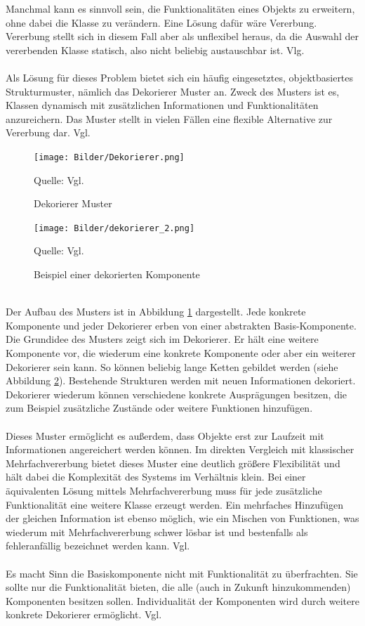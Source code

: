 \documentclass[fontsize=11pt,a4paper,final]{scrreprt}[2003/01/01]
\newcommand*{\quelle}{%
	\footnotesize Quelle: 
}
\begin{document}
Manchmal kann es sinnvoll sein, die Funktionalitäten eines Objekts zu erweitern, ohne dabei die Klasse zu verändern. Eine Lösung dafür wäre Vererbung. Vererbung stellt sich in diesem Fall aber als unflexibel heraus, da die Auswahl der vererbenden Klasse statisch, also nicht beliebig austauschbar ist. Vlg. \cite[S. 199]{gamma2004}
\\ \\
Als Lösung für dieses Problem bietet sich ein häufig eingesetztes, objektbasiertes Strukturmuster, nämlich das Dekorierer Muster an. Zweck des Musters ist es, Klassen dynamisch mit zusätzlichen Informationen und Funktionalitäten anzureichern. Das Muster stellt in vielen Fällen eine flexible Alternative zur Vererbung dar. Vgl. \cite[S. 199 ]{gamma2004}

\begin{figure}[H]
	\centering
	\texttt{[image: Bilder/Dekorierer.png]}
	\caption{Dekorierer Muster}
	\quelle{ Vgl. \cite[S. 201]{gamma2004}}
	\label{fig:Dekorierer}
\end{figure}

\begin{figure}[H]
	\centering
	\texttt{[image: Bilder/dekorierer\_2.png]}
	\caption{Beispiel einer dekorierten Komponente}
	\quelle{Vgl. \cite[S. 205]{gamma2004}} 
	\label{fig:Beispiel einer dekorierten Komponente}
\end{figure}
\ \\
Der Aufbau des Musters ist in Abbildung \ref{fig:Dekorierer} dargestellt. Jede konkrete Komponente und jeder Dekorierer erben von einer abstrakten Basis-Komponente. Die Grundidee des Musters zeigt sich im Dekorierer. Er hält eine weitere Komponente vor, die wiederum eine konkrete Komponente oder aber ein weiterer Dekorierer sein kann. So können beliebig lange Ketten gebildet werden (siehe Abbildung \ref{fig:Beispiel einer dekorierten Komponente}). Bestehende Strukturen werden mit neuen Informationen \glqq dekoriert\grqq. Dekorierer wiederum können verschiedene konkrete Ausprägungen besitzen, die zum Beispiel zusätzliche Zustände oder weitere Funktionen hinzufügen.
\\ \\
Dieses Muster ermöglicht es außerdem, dass Objekte erst zur Laufzeit mit Informationen angereichert werden können. Im direkten Vergleich mit klassischer Mehrfachvererbung bietet dieses Muster eine deutlich größere Flexibilität und hält dabei die Komplexität des Systems im Verhältnis klein. Bei einer äquivalenten Lösung mittels Mehrfachvererbung muss für jede zusätzliche Funktionalität eine weitere Klasse erzeugt werden. Ein mehrfaches Hinzufügen der gleichen Information ist ebenso möglich, wie ein Mischen von Funktionen, was wiederum mit Mehrfachvererbung schwer lösbar ist und bestenfalls als fehleranfällig bezeichnet werden kann. Vgl. \cite[S. 203]{gamma2004}
\\ \\
Es macht Sinn die Basiskomponente nicht mit Funktionalität zu überfrachten. Sie sollte nur die Funktionalität bieten, die alle (auch in Zukunft hinzukommenden) Komponenten besitzen sollen. Individualität der Komponenten wird durch weitere konkrete Dekorierer ermöglicht. Vgl. \cite[S. 203 - 204]{gamma2004}
\end{document}
